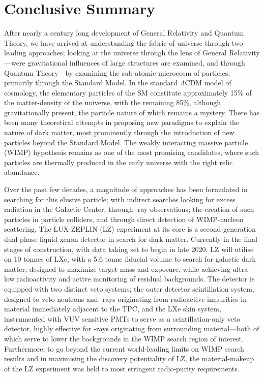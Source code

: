 \chapter{Conclusive Summary}
\label{chap:chap8}

After nearly a century long development of General Relativity and Quantum Theory, we have arrived at understanding the fabric of universe through two leading approaches; looking at the universe through the lens of General Relativity---were gravitational influences of large structures are examined, and through Quantum Theory---by examining the sub-atomic microcosm of particles, primarily through the Standard Model. In the standard $\Lambda$CDM model of cosmology, the elementary particles of the SM constitute approximately 15\% of the matter-density of the universe, with the remaining 85\%, although gravitationally present, the particle nature of which remains a mystery. There has been many theoretical attempts in proposing new paradigms to explain the nature of dark matter, most prominently through the introduction of new particles beyond the Standard Model. The weakly interacting massive particle (WIMP) hypothesis remains as one of the most promising candidates, where such particles are thermally produced in the early universe with the right relic abundance. 

Over the past few decades, a magnitude of approaches has been formulated in  searching for this elusive particle; with indirect searches looking for excess radiation in the Galactic Center, through \gamma-ray observations; the creation of such particles in particle colliders, and through direct detection of WIMP-nucleon scattering. The LUX-ZEPLIN (LZ) experiment at its core is a second-generation dual-phase liquid xenon detector in search for dark matter. Currently in the final stages of construction, with data taking set to begin in late 2020, LZ will utilise on 10 tonnes of LXe, with a 5.6 tonne fiducial volume to search for galactic dark matter; designed to maximize target mass and exposure, while achieving ultra-low radioactivity and active monitoring of residual backgrounds. The detector is equipped with two distinct veto systems; the outer detector scintillation system, designed to veto neutrons and \gamma{}-rays originating from radioactive impurities in material immediately adjacent to the TPC, and the LXe skin system, instrumented with VUV sensitive PMTs to serve as a scintillation-only veto detector, highly effective for \gamma{}-rays originating from surrounding material---both of which serve to lower the backgrounds in the WIMP search region of interest. Furthermore, to go beyond the current world-leading limits on WIMP search results and in maximising the discovery potentiality of LZ, the material-makeup of the LZ experiment was held to most stringent radio-purity requirements. 

